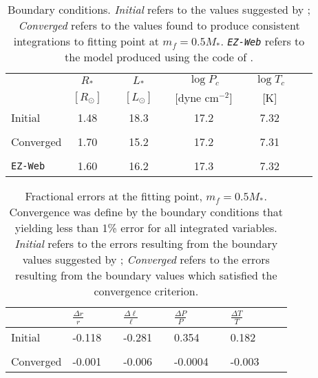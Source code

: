 \begin{table}[t]
\begin{ruledtabular}
\begin{tabular}{l cr cr cr cr c}
 & $R_\ast $  && $L_\ast$ && $\log P_c $ && $\log T_c $\\
  & $[R_\odot]$  && $[L_\odot]$ && $[$dyne cm$^{-2}$] && [K]\\
\hline

Initial & 1.48 && 18.3 && 17.2 && 7.32\\ \\
Converged & 1.70 && 15.2 && 17.2 && 7.31 \\ \\
\texttt{EZ-Web} & 1.60 && 16.2 && 17.3 && 7.32


\end{tabular}
\end{ruledtabular}
\caption{\label{table:bounds} Boundary conditions.  \emph{Initial} refers to the values suggested by \cite{Hansen}; \emph{Converged} refers to the values found to produce consistent integrations to fitting point at $m_f = 0.5 M_\ast$. \emph{\texttt{EZ-Web}} refers to the model produced using the code of \cite[see Section \ref{sec:Results:comparison}]{EZWeb}.}
\end{table}

\begin{table}[t]
\begin{ruledtabular}
\begin{tabular}{l lr lr lr lr c}
 & $\frac{\Delta r}{r} $  && $\frac{\Delta \ell}{\ell} $ && $\frac{\Delta P}{P} $ && $\frac{\Delta T}{T} $\\
\hline

Initial & -0.118 && -0.281 && \phantom{-}0.354 && \phantom{-}0.182\\ \\
Converged & -0.001 && -0.006 && -0.0004 && -0.003

\end{tabular}
\end{ruledtabular}
\caption{\label{table:errors} Fractional errors at the fitting point, $m_f = 0.5 M_\ast$.  Convergence was define by the boundary conditions that yielding less than 1\% error for all integrated variables. \emph{Initial} refers to the errors resulting from the boundary values suggested by \cite{Hansen}; \emph{Converged} refers to the errors resulting from the boundary values which satisfied the convergence criterion.}
\end{table}

